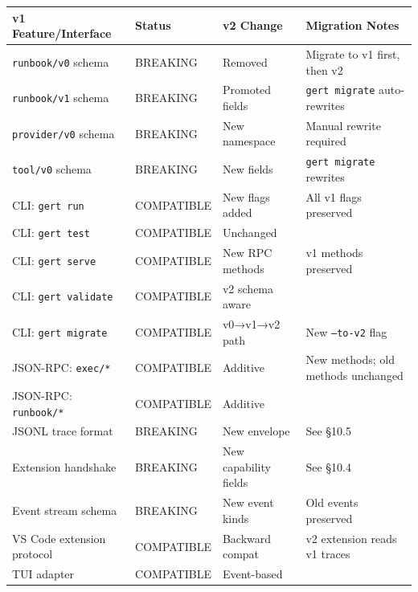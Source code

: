 \begin{center}
\small
\begin{tabular}{lllp{5cm}}
\textbf{v1 Feature/Interface} & \textbf{Status} & \textbf{v2 Change} & \textbf{Migration Notes} \\
\hline
\texttt{runbook/v0} schema & BREAKING & Removed & Migrate to v1 first, then v2 \\
\texttt{runbook/v1} schema & BREAKING & Promoted fields & \texttt{gert migrate} auto-rewrites \\
\texttt{provider/v0} schema & BREAKING & New namespace & Manual rewrite required \\
\texttt{tool/v0} schema & BREAKING & New fields & \texttt{gert migrate} rewrites \\
CLI: \texttt{gert run} & COMPATIBLE & New flags added & All v1 flags preserved \\
CLI: \texttt{gert test} & COMPATIBLE & Unchanged & \\
CLI: \texttt{gert serve} & COMPATIBLE & New RPC methods & v1 methods preserved \\
CLI: \texttt{gert validate} & COMPATIBLE & v2 schema aware & \\
CLI: \texttt{gert migrate} & COMPATIBLE & v0→v1→v2 path & New \texttt{--to-v2} flag \\
JSON-RPC: \texttt{exec/*} & COMPATIBLE & Additive & New methods; old methods unchanged \\
JSON-RPC: \texttt{runbook/*} & COMPATIBLE & Additive & \\
JSONL trace format & BREAKING & New envelope & See §10.5 \\
Extension handshake & BREAKING & New capability fields & See §10.4 \\
Event stream schema & BREAKING & New event kinds & Old events preserved \\
VS Code extension protocol & COMPATIBLE & Backward compat & v2 extension reads v1 traces \\
TUI adapter & COMPATIBLE & Event-based & \\
\end{tabular}
\end{center}

